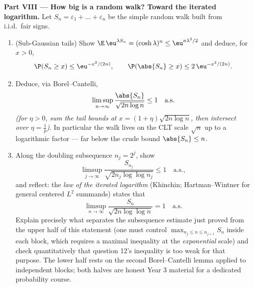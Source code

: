 \begin{problem}
\medskip
\noindent\textbf{Part VIII --- How big is a random walk?
Toward the iterated logarithm.} Let $S_n = \varepsilon_1 +
\dots + \varepsilon_n$ be the simple random walk built from
i.i.d.\ fair signs.
\begin{enumerate}[resume]
  \item (Sub-Gaussian tails) Show $\E\,\eu^{\lambda S_n} =
        (\cosh\lambda)^n \leq \eu^{n\lambda^2/2}$ and
        deduce, for $x > 0$,
        \[
        \P(S_n \geq x) \leq \eu^{-x^2/(2n)},
        \qquad
        \P(\abs{S_n} \geq x) \leq 2\,\eu^{-x^2/(2n)} .
        \]
  \item Deduce, via Borel--Cantelli,
        \[
        \limsup_{n\to\infty}\frac{\abs{S_n}}
        {\sqrt{2n\log n}} \leq 1 \quad\text{a.s.}
        \]
        \emph{(for $\eta > 0$, sum the tail bounds at $x =
        (1 + \eta)\sqrt{2n\log n}$, then intersect over
        $\eta = \frac1p$)}. In particular the walk lives on
        the CLT scale $\sqrt n$ up to a logarithmic factor
        --- far below the crude bound $\abs{S_n} \leq n$.
  \item Along the doubling subsequence $n_j = 2^j$, show
        \[
        \limsup_{j\to\infty}\frac{S_{n_j}}
        {\sqrt{2n_j\log\log n_j}} \leq 1 \quad\text{a.s.},
        \]
        and reflect: the \emph{law of the iterated
        logarithm} (Khinchin; Hartman--Wintner for general
        centered $L^2$ summands) states that
        \[
        \limsup_{n\to\infty}\frac{S_n}
        {\sqrt{2n\log\log n}} = 1 \quad\text{a.s.}
        \]
        Explain precisely what separates the subsequence
        estimate just proved from the upper half of this
        statement (one must control $\max_{n_j \leq n \leq
        n_{j+1}}S_n$ inside each block, which requires a
        maximal inequality at the \emph{exponential} scale)
        and check quantitatively that question 12's
        inequality is too weak for that purpose. The lower
        half rests on the second Borel--Cantelli lemma
        applied to independent blocks; both halves are
        honest Year 3 material for a dedicated probability
        course.


\end{enumerate}
\end{problem}
